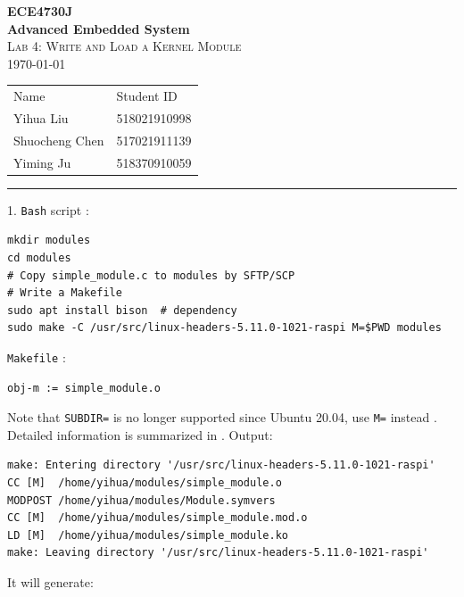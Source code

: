 \documentclass[a4paper]{article}
\begin{document}
\begin{center}
    \huge
    \textbf{ECE4730J\\Advanced Embedded System\\}
    \LARGE
    \vspace{15pt}
    \textsc{Lab 4: Write and Load a Kernel Module}\\
    \large
    \vspace{5pt}\today\\
    \vspace{5pt}
    \begin{tabular}{ll}
        Name&Student ID\\
        Yihua Liu&518021910998\\
        Shuocheng Chen&517021911139\\
        Yiming Ju&518370910059\\
    \end{tabular}
    \vspace{5pt}
    \rule[-5pt]{.97\linewidth}{0.05em}
\end{center}
1. \texttt{Bash} script \cite{compilingkm}:
\begin{verbatim}
mkdir modules
cd modules
# Copy simple_module.c to modules by SFTP/SCP
# Write a Makefile
sudo apt install bison  # dependency
sudo make -C /usr/src/linux-headers-5.11.0-1021-raspi M=$PWD modules
\end{verbatim}
\texttt{Makefile} \cite{love2010linux}:
\begin{verbatim}
obj-m := simple_module.o    
\end{verbatim}
Note that \texttt{SUBDIR=} is no longer supported since Ubuntu 20.04, use \texttt{M=} instead \cite{subdir}. Detailed information is summarized in \cite{classmap}. Output:
\begin{verbatim}
make: Entering directory '/usr/src/linux-headers-5.11.0-1021-raspi'
CC [M]  /home/yihua/modules/simple_module.o
MODPOST /home/yihua/modules/Module.symvers
CC [M]  /home/yihua/modules/simple_module.mod.o
LD [M]  /home/yihua/modules/simple_module.ko
make: Leaving directory '/usr/src/linux-headers-5.11.0-1021-raspi'      
\end{verbatim}
It will generate:
\end{document}
